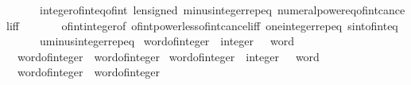 \begin{isabellebody}
\ \ \ \ \ \ integer{\isacharunderscore}{\kern0pt}of{\isacharunderscore}{\kern0pt}int{\isacharunderscore}{\kern0pt}eq{\isacharunderscore}{\kern0pt}of{\isacharunderscore}{\kern0pt}int\ len{\isacharunderscore}{\kern0pt}signed\ minus{\isacharunderscore}{\kern0pt}integer{\isachardot}{\kern0pt}rep{\isacharunderscore}{\kern0pt}eq\ numeral{\isacharunderscore}{\kern0pt}power{\isacharunderscore}{\kern0pt}eq{\isacharunderscore}{\kern0pt}of{\isacharunderscore}{\kern0pt}int{\isacharunderscore}{\kern0pt}cancel{\isacharunderscore}{\kern0pt}iff\ \isanewline
\ \ \ \ \ \ of{\isacharunderscore}{\kern0pt}int{\isacharunderscore}{\kern0pt}integer{\isacharunderscore}{\kern0pt}of\ of{\isacharunderscore}{\kern0pt}int{\isacharunderscore}{\kern0pt}power{\isacharunderscore}{\kern0pt}less{\isacharunderscore}{\kern0pt}of{\isacharunderscore}{\kern0pt}int{\isacharunderscore}{\kern0pt}cancel{\isacharunderscore}{\kern0pt}iff\ one{\isacharunderscore}{\kern0pt}integer{\isachardot}{\kern0pt}rep{\isacharunderscore}{\kern0pt}eq\ sint{\isacharunderscore}{\kern0pt}of{\isacharunderscore}{\kern0pt}int{\isacharunderscore}{\kern0pt}eq\ \isanewline
\ \ \ \ \ \ uminus{\isacharunderscore}{\kern0pt}integer{\isachardot}{\kern0pt}rep{\isacharunderscore}{\kern0pt}eq{\isacharparenright}{\kern0pt}%
\endisatagproof
{\isafoldproof}%
%
\isadelimproof
\isanewline
%
\endisadelimproof
\isanewline
{}\isamarkupfalse%
\ word{}{\isacharunderscore}{\kern0pt}of{\isacharunderscore}{\kern0pt}integer\ {\isacharcolon}{\kern0pt}{\isacharcolon}{\kern0pt}\ {\isachardoublequoteopen}integer\ {\isasymRightarrow}\ {}\ word{\isachardoublequoteclose}\isanewline
\ \ \isanewline
\ \ {\isachardoublequoteopen}word{}{\isacharunderscore}{\kern0pt}of{\isacharunderscore}{\kern0pt}integer\ {\isasymequiv}\ word{\isacharunderscore}{\kern0pt}of{\isacharunderscore}{\kern0pt}integer{\isachardoublequoteclose}\isanewline
\isanewline
{}\isamarkupfalse%
\ word{}{}{\isacharunderscore}{\kern0pt}of{\isacharunderscore}{\kern0pt}integer\ {\isacharcolon}{\kern0pt}{\isacharcolon}{\kern0pt}\ {\isachardoublequoteopen}integer\ {\isasymRightarrow}\ {}{}\ word{\isachardoublequoteclose}\isanewline
\ \ \isanewline
\ \ {\isachardoublequoteopen}word{}{}{\isacharunderscore}{\kern0pt}of{\isacharunderscore}{\kern0pt}integer\ {\isasymequiv}\ word{\isacharunderscore}{\kern0pt}of{\isacharunderscore}{\kern0pt}integer{\isachardoublequoteclose}\isanewline
\isanewline
{}\isamarkupfalse%

\end{isabellebody}
